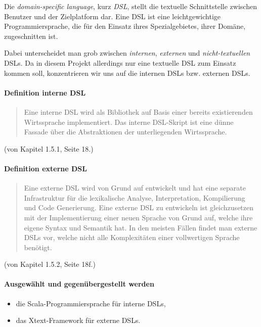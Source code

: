 Die \emph{domain-specific language}, kurz \emph{DSL}, stellt die
textuelle Schnittstelle zwischen Benutzer und der Zielplatform dar.
Eine DSL ist eine leichtgewichtige Programmiersprache, die für den
Einsatz ihres Spezialgebietes, ihrer Domäne, zugeschnitten ist.

Dabei unterscheidet man grob zwischen \emph{internen}, \emph{externen}
und \emph{nicht-textuellen} DSLs.\cite{dsls} Da in diesem Projekt allerdings
nur eine textuelle DSL zum Einsatz kommen soll, konzentrieren wir uns
auf die internen DSLs bzw. externen DSLs.

\paragraph{Definition interne DSL}
\begin{quote}
Eine interne DSL wird als Bibliothek auf Basis
einer bereits existierenden Wirtssprache implementiert. Das interne DSL-Skript
ist eine dünne Fassade über die Abstraktionen der unterliegenden Wirtssprache.
\end{quote} (von \cite{dsls} Kapitel 1.5.1, Seite 18.)

\paragraph{Definition externe DSL}
\begin{quote}
Eine externe DSL wird von Grund auf entwickelt und hat eine separate
Infrastruktur für die lexikalische Analyse, Interpretation, Kompilierung
und Code Generierung. Eine externe DSL zu entwickeln ist gleichzusetzen mit
der Implementierung einer neuen Sprache von Grund auf, welche ihre eigene
Syntax und Semantik hat.
In den meisten Fällen findet man externe DSLs vor, welche nicht alle
Komplexitäten einer vollwertigen Sprache benötigt.
\end{quote} (von \cite{dsls} Kapitel 1.5.2, Seite 18f.)

\paragraph{Ausgewählt und gegenübergestellt werden}

\begin{itemize}
  \item die Scala-Programmiersprache für interne DSLs,
  \item das Xtext-Framework für externe DSLs.
\end{itemize}

